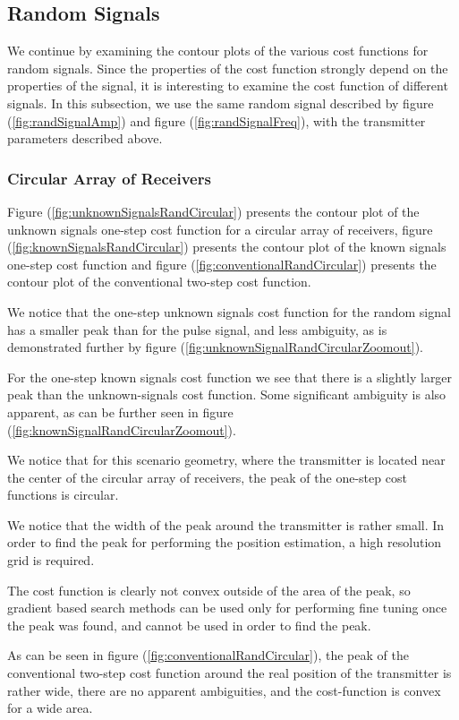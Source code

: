 \subsection{Random Signals}
We continue by examining the contour plots of the various cost functions for random signals. Since the properties of the cost function strongly depend on the properties of the signal, it is interesting to examine the cost function of different signals.
In this subsection, we use the same random signal described by figure (\ref{fig:randSignalAmp}) and figure (\ref{fig:randSignalFreq}), with the transmitter parameters described above.

\subsubsection*{Circular Array of Receivers}
Figure (\ref{fig:unknownSignalsRandCircular}) presents the contour plot of the unknown signals one-step cost function for a circular array of receivers, figure (\ref{fig:knownSignalsRandCircular}) presents the contour plot of the known signals one-step cost function and figure (\ref{fig:conventionalRandCircular}) presents the contour plot of the conventional two-step cost function.

We notice that the one-step unknown signals cost function for the random signal has a smaller peak than for the pulse signal, and less ambiguity, as is demonstrated further by figure (\ref{fig:unknownSignalRandCircularZoomout}).

For the one-step known signals cost function we see that there is a slightly larger peak than the unknown-signals cost function. Some significant ambiguity is also apparent, as can be further seen in figure (\ref{fig:knownSignalRandCircularZoomout}).

We notice that for this scenario geometry, where the transmitter is located near the center of the circular array of receivers, the peak of the one-step cost functions is circular. 

We notice that the width of the peak around the transmitter is rather small. In order to find the peak for performing the position estimation, a high resolution grid is required. 

The cost function is clearly not convex outside of the area of the peak, so gradient based search methods can be used only for performing fine tuning once the peak was found, and cannot be used in order to find the peak.

As can be seen in figure (\ref{fig:conventionalRandCircular}), the peak of the conventional two-step cost function around the real position of the transmitter is rather wide, there are no apparent ambiguities, and the cost-function is convex for a wide area. 

